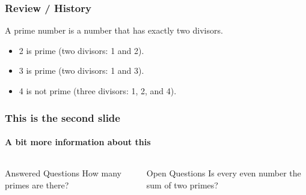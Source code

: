 
\begin{frame}
\frametitle{Review / History}

\begin{definition}
	A \alert{prime number} is a number that has exactly two divisors.
\end{definition}

\begin{example}
	\begin{itemize}
		\item 2 is prime (two divisors: 1 and 2).
		\pause
		\item 3 is prime (two divisors: 1 and 3).
		\pause
		\item 4 is not prime (\alert{three} divisors: 1, 2, and 4).
	\end{itemize}
\end{example}

\end{frame}


\begin{frame}
\frametitle{This is the second slide}
\framesubtitle{A bit more information about this}

\begin{columns}
		\begin{block}{Answered Questions}
			How many primes are there?
		\end{block}
		\begin{block}{Open Questions}
			Is every even number the sum of two primes?
		\end{block}
\end{columns}

\end{frame}